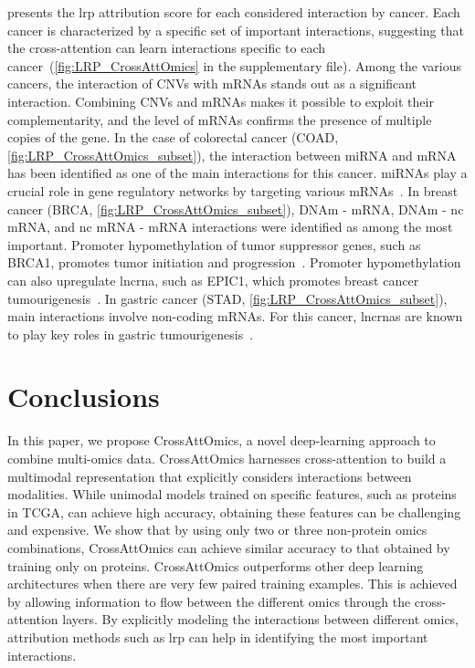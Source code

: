 \documentclass[../main.tex]{subfiles}
\begin{document}
      presents the \gls{lrp} attribution score for each considered interaction by cancer.
     Each cancer is characterized by a specific set of important interactions, suggesting that the cross-attention can learn interactions specific to each cancer~(\cref{fig:LRP_CrossAttOmics} in the supplementary file).
     Among the various cancers, the interaction of CNVs with mRNAs stands out as a significant interaction.
     Combining CNVs and mRNAs makes it possible to exploit their complementarity, and the level of mRNAs confirms the presence of multiple copies of the gene.
     In the case of colorectal cancer (COAD, \cref{fig:LRP_CrossAttOmics_subset}),  the interaction between miRNA and mRNA has been identified as one of the main interactions for this cancer.
     miRNAs play a crucial role in gene regulatory networks by targeting various mRNAs~\cite{Amirkhah2015}.
     In breast cancer (BRCA, \cref{fig:LRP_CrossAttOmics_subset}), DNAm - mRNA, DNAm - nc mRNA, and nc mRNA - mRNA interactions were identified as among the most important.
     Promoter hypomethylation of tumor suppressor genes, such as BRCA1, promotes tumor initiation and progression~\cite{Szyf2004}.
     Promoter hypomethylation can also upregulate \gls{lncrna}, such as EPIC1, which promotes breast cancer tumourigenesis~\cite{Wang2018}.
     In gastric cancer (STAD, \cref{fig:LRP_CrossAttOmics_subset}), main interactions involve non-coding mRNAs.
     For this cancer, \glspl{lncrna} are known to play key roles in gastric tumourigenesis~\cite{Tan2020}.

\section{Conclusions}
 In this paper, we propose CrossAttOmics, a novel deep-learning approach to combine multi-omics data.
 CrossAttOmics harnesses cross-attention to build a multimodal representation that explicitly considers interactions between modalities.
 While unimodal models trained on specific features, such as proteins in TCGA, can achieve high accuracy, obtaining these features can be challenging and expensive.
 We show that by using only two or three non-protein omics combinations, CrossAttOmics can achieve similar accuracy to that obtained by training only on proteins.
 CrossAttOmics outperforms other deep learning architectures when there are very few paired training examples.
 This is achieved by allowing information to flow between the different omics through the cross-attention layers.
 By explicitly modeling the interactions between different omics, attribution methods such as \gls{lrp} can help in identifying the most important interactions.
\end{document}
